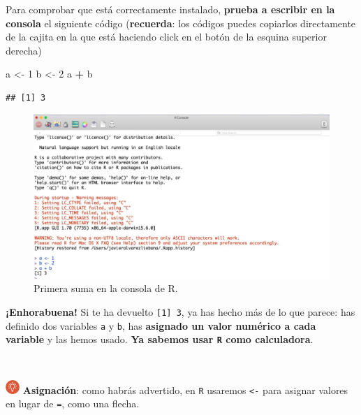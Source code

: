 \documentclass[11pt,]{book}
\newenvironment{Shaded}{\begin{snugshade}}{\end{snugshade}}
\newcommand{\DecValTok}[1]{\textcolor[rgb]{0.06,0.06,0.06}{#1}}
\newcommand{\NormalTok}[1]{#1}
\newcommand{\OperatorTok}[1]{\textcolor[rgb]{0.43,0.43,0.43}{\textbf{#1}}}
\newcommand{\StringTok}[1]{\textcolor[rgb]{0.5,0.5,0.5}{#1}}
\begin{document}
Para comprobar que está correctamente instalado, \textbf{prueba a escribir en la consola} el siguiente código (\textbf{recuerda}: los códigos puedes copiarlos directamente de la cajita en la que está haciendo click en el botón de la esquina superior derecha)

\begin{Shaded}
\begin{Highlighting}[]
\NormalTok{a <-}\StringTok{ }\DecValTok{1}
\NormalTok{b <-}\StringTok{ }\DecValTok{2}
\NormalTok{a }\OperatorTok{+}\StringTok{ }\NormalTok{b}
\end{Highlighting}
\end{Shaded}

\begin{verbatim}
## [1] 3
\end{verbatim}

\begin{figure}

{\centering \includegraphics[width=0.75\linewidth]{./img/primera_suma} 

}

\caption{Primera suma en la consola de R.}\label{fig:primera-suma}
\end{figure}

\textbf{¡Enhorabuena!} Si te ha devuelto \texttt{{[}1{]}\ 3}, ya has hecho más de lo que parece: has definido dos variables \texttt{a} y \texttt{b}, has \textbf{asignado un valor numérico a cada variable} y las hemos usado. \textbf{Ya sabemos usar \texttt{R} como calculadora}.

~

\includegraphics[width=0.04\textwidth,height=\textheight]{img/logo_info.png} \textbf{Asignación}: como habrás advertido, en \texttt{R} usaremos \texttt{\textless{}-} para asignar valores en lugar de \texttt{=}, como una flecha.

~
\end{document}
